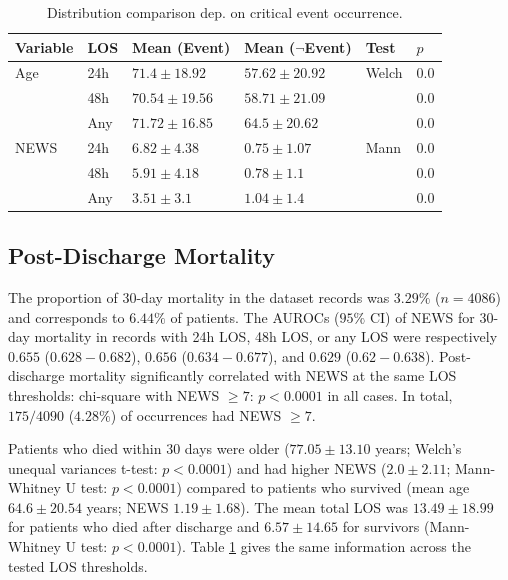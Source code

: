 \documentclass[10pt,journal, compsoc]{IEEEtran}
\begin{document}
\begin{table}[!t]
    \renewcommand{\arraystretch}{1.3}
    \centering
    \caption{Distribution comparison dep. on critical event occurrence.}
    \label{tab:criticalevent_stats}
    \begin{tabular}{llllll}
        \toprule
        Variable & LOS & Mean (Event)      & Mean ($\lnot$Event) & Test  & $p$   \\
        \midrule
        Age      & 24h & $71.4 \pm 18.92$  & $57.62 \pm 20.92$   & Welch & $0.0$ \\
                 & 48h & $70.54 \pm 19.56$ & $58.71 \pm 21.09$   &       & $0.0$ \\
                 & Any & $71.72 \pm 16.85$ & $64.5 \pm 20.62$    &       & $0.0$ \\
        NEWS     & 24h & $6.82 \pm 4.38$   & $0.75 \pm 1.07$     & Mann  & $0.0$ \\
                 & 48h & $5.91 \pm 4.18$   & $0.78 \pm 1.1$      &       & $0.0$ \\
                 & Any & $3.51 \pm 3.1$    & $1.04 \pm 1.4$      &       & $0.0$ \\

        \bottomrule
    \end{tabular}
\end{table}

\subsection{Post-Discharge Mortality}
The proportion of 30-day mortality in the dataset records was $3.29\%$ ($n=4086$) and corresponds to $6.44\%$ of patients. The AUROCs ($95\%$ CI) of NEWS for 30-day mortality in records with 24h LOS, 48h LOS, or any LOS were respectively $0.655$ ($0.628-0.682$), $0.656$ ($0.634-0.677$), and $0.629$ ($0.62-0.638$). Post-discharge mortality significantly correlated with NEWS at the same LOS thresholds: chi-square with NEWS $\geq 7$: $p < 0.0001$ in all cases. In total, $175/4090$ ($4.28\%$) of occurrences had NEWS $\geq 7$.

Patients who died within 30 days were older ($77.05 \pm 13.10$ years; Welch's unequal variances t-test: $p < 0.0001$) and had higher NEWS ($2.0 \pm 2.11$; Mann-Whitney U test: $p < 0.0001$) compared to patients who survived (mean age $64.6 \pm 20.54$ years; NEWS $1.19 \pm 1.68$). The mean total LOS was $13.49 \pm 18.99$ for patients who died after discharge and $6.57 \pm 14.65$ for survivors (Mann-Whitney U test: $p < 0.0001$). Table \ref{tab:criticalevent_stats} gives the same information across the tested LOS thresholds.
\end{document}
